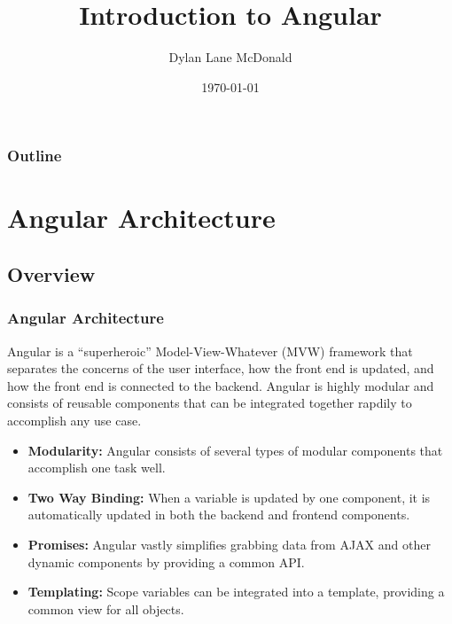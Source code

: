 \documentclass[aspectratio=169]{beamer}
\title{Introduction to Angular}
\author{Dylan Lane McDonald}
\institute{CNM STEMulus Center\\Web Development with PHP}
\date{\today}
\begin{document}
\lstset{language=HTML}
\begin{frame}
\titlepage
\end{frame}

\begin{frame}
\frametitle{Outline}
\tableofcontents
\end{frame}

\section{Angular Architecture}
\subsection{Overview}
\begin{frame}
\frametitle{Angular Architecture}
Angular is a ``superheroic'' Model-View-Whatever (MVW) framework that separates the concerns of the user interface, how the front end is updated, and how the front end is connected to the backend. Angular is highly modular and consists of reusable components that can be integrated together rapdily to accomplish any use case.

\begin{itemize}
	\item \textbf{Modularity:} Angular consists of several types of modular components that accomplish one task well.
	\item \textbf{Two Way Binding:} When a variable is updated by one component, it is automatically updated in both the backend and frontend components.
	\item \textbf{Promises:} Angular vastly simplifies grabbing data from AJAX and other dynamic components by providing a common API.
	\item \textbf{Templating:} Scope variables can be integrated into a template, providing a common view for all objects.
\end{itemize}
\end{frame}
\end{document}
